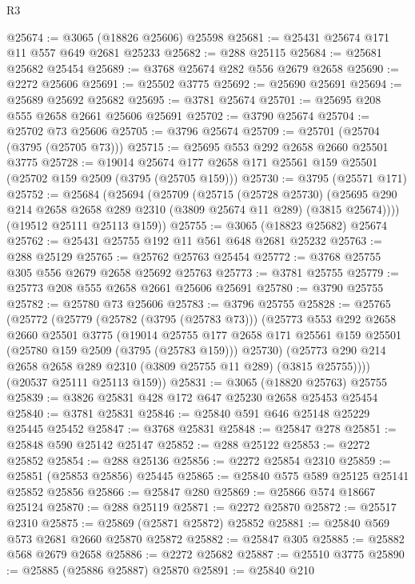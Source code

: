 \begin{lexlean}{R3}
\begin{coremodule}
@25674 := @3065 (@18826 @25606) @25598
@25681 := @25431 @25674 @171 @11 @557 @649 @2681 @25233
@25682 := @288 @25115
@25684 := @25681 @25682 @25454
@25689 := @3768 @25674 @282 @556 @2679 @2658
@25690 := @2272 @25606
@25691 := @25502 @3775
@25692 := @25690 @25691
@25694 := @25689 @25692 @25682
@25695 := @3781 @25674
@25701 := @25695 @208 @555 @2658 @2661 @25606 @25691
@25702 := @3790 @25674
@25704 := @25702 @73 @25606
@25705 := @3796 @25674
@25709 := @25701 (@25704 (@3795 (@25705 @73)))
@25715 := @25695 @553 @292 @2658 @2660 @25501 @3775
@25728 := @19014 @25674 @177 @2658 @171 @25561 @159 @25501 (@25702 @159 @2509 (@3795 (@25705 @159)))
@25730 := @3795 (@25571 @171)
@25752 := @25684
    (@25694
      (@25709
        (@25715
          (@25728 @25730)
          (@25695 @290 @214 @2658 @2658 @289 @2310 (@3809 @25674 @11 @289) (@3815 @25674))))
      (@19512 @25111 @25113 @159))
@25755 := @3065 (@18823 @25682) @25674
@25762 := @25431 @25755 @192 @11 @561 @648 @2681 @25232
@25763 := @288 @25129
@25765 := @25762 @25763 @25454
@25772 := @3768 @25755 @305 @556 @2679 @2658 @25692 @25763
@25773 := @3781 @25755
@25779 := @25773 @208 @555 @2658 @2661 @25606 @25691
@25780 := @3790 @25755
@25782 := @25780 @73 @25606
@25783 := @3796 @25755
@25828 := @25765
    (@25772
      (@25779
        (@25782 (@3795 (@25783 @73)))
        (@25773
          @553
          @292
          @2658
          @2660
          @25501
          @3775
          (@19014
            @25755
            @177
            @2658
            @171
            @25561
            @159
            @25501
            (@25780 @159 @2509 (@3795 (@25783 @159)))
            @25730)
          (@25773 @290 @214 @2658 @2658 @289 @2310 (@3809 @25755 @11 @289) (@3815 @25755))))
      (@20537 @25111 @25113 @159))
@25831 := @3065 (@18820 @25763) @25755
@25839 := @3826 @25831 @428 @172 @647 @25230 @2658 @25453 @25454
@25840 := @3781 @25831
@25846 := @25840 @591 @646 @25148 @25229 @25445 @25452
@25847 := @3768 @25831
@25848 := @25847 @278
@25851 := @25848 @590 @25142 @25147
@25852 := @288 @25122
@25853 := @2272 @25852
@25854 := @288 @25136
@25856 := @2272 @25854 @2310
@25859 := @25851 (@25853 @25856) @25445
@25865 := @25840 @575 @589 @25125 @25141 @25852 @25856
@25866 := @25847 @280
@25869 := @25866 @574 @18667 @25124
@25870 := @288 @25119
@25871 := @2272 @25870
@25872 := @25517 @2310
@25875 := @25869 (@25871 @25872) @25852
@25881 := @25840 @569 @573 @2681 @2660 @25870 @25872
@25882 := @25847 @305
@25885 := @25882 @568 @2679 @2658
@25886 := @2272 @25682
@25887 := @25510 @3775
@25890 := @25885 (@25886 @25887) @25870
@25891 := @25840 @210

\end{coremodule}
\end{lexlean}
